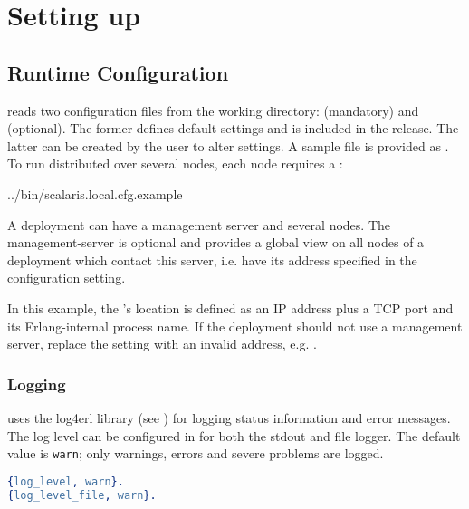 \chapter{Setting up \scalaris{}}
\label{chapter.runscalaris}

\section{Runtime Configuration}
\label{chapter.runscalaris.runtime_config}

\scalaris{} reads two configuration files from the working directory:
 (mandatory) and 
(optional). The former defines default settings and is included in the
release. The latter can be created by the user to alter settings.  A
sample file is provided as . To run
\scalaris{} distributed over several nodes, each node requires a
:

            {../bin/scalaris.local.cfg.example}

A \scalaris{} deployment can have a management server and several nodes. The
management-server is optional and provides a global view on all nodes of a
\scalaris{} deployment which contact this server, i.e. have its address
specified in the  configuration setting.

In this example, the 's location is defined as
an IP address plus a TCP port and its Erlang-internal process name.
If the deployment should not use a management server, replace the setting with
an invalid address, e.g. .

\subsection{Logging}
\label{sec:logging}

\scalaris{} uses the log4erl library (see ) for
logging status information and error messages. The log level can be
configured in  for both the stdout and file logger.
The default value is {\tt warn}; only warnings, errors and severe problems are
logged.

\begin{lstlisting}[language=erlang]
%% @doc Loglevel: debug < info < warn < error < fatal < none
{log_level, warn}.
{log_level_file, warn}.
\end{lstlisting}

